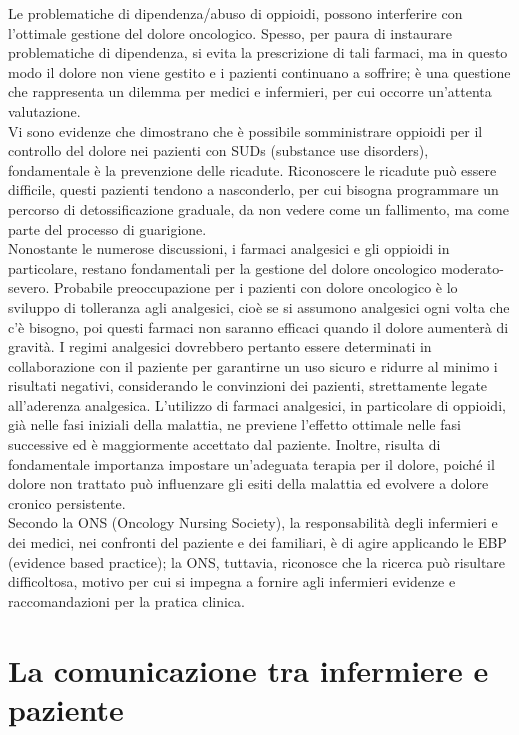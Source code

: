 Le problematiche di dipendenza/abuso di oppioidi, possono interferire con l’ottimale gestione del dolore oncologico. 
Spesso, per paura di instaurare problematiche di dipendenza, si evita la prescrizione di tali farmaci, 
ma in questo modo il dolore non viene gestito e i pazienti continuano a soffrire; 
è una questione che rappresenta un dilemma per medici e infermieri, per cui occorre un’attenta valutazione\cite{PAINONS}.\\ 
Vi sono evidenze che dimostrano che è possibile somministrare oppioidi per il controllo del dolore nei pazienti con SUDs 
(substance use disorders), fondamentale è la prevenzione delle ricadute. Riconoscere le ricadute può essere difficile, 
questi pazienti tendono a nasconderlo, per cui bisogna programmare un percorso di detossificazione graduale, 
da non vedere come un fallimento, ma come parte del processo di guarigione\cite{CANCERPAINONS}.\\
Nonostante le numerose discussioni, i farmaci analgesici e gli oppioidi in particolare, restano fondamentali per 
la gestione del dolore oncologico moderato-severo. Probabile preoccupazione per i pazienti con dolore oncologico 
è lo sviluppo di tolleranza agli analgesici, cioè se si assumono analgesici ogni volta che c’è bisogno, poi questi 
farmaci non saranno efficaci quando il dolore aumenterà di gravità. I regimi analgesici dovrebbero pertanto essere 
determinati in collaborazione con il paziente per garantirne un uso sicuro e ridurre al minimo i risultati negativi, 
considerando le convinzioni dei pazienti, strettamente legate all’aderenza analgesica\cite{analgesici}. L’utilizzo di 
farmaci analgesici, in particolare di oppioidi, già nelle fasi iniziali della malattia, ne previene l’effetto ottimale 
nelle fasi successive ed è maggiormente accettato dal paziente. Inoltre, risulta di fondamentale importanza impostare 
un’adeguata terapia per il dolore, poiché il dolore non trattato può influenzare gli esiti della malattia ed evolvere 
a dolore cronico persistente.\\ 

Secondo la ONS (Oncology Nursing Society), la responsabilità degli infermieri e dei medici, nei confronti 
del paziente e dei familiari, è di agire applicando le EBP (evidence based practice); 
la ONS, tuttavia, riconosce che la ricerca può risultare difficoltosa, 
motivo per cui si impegna a fornire agli infermieri evidenze e raccomandazioni per la pratica clinica\cite{PAINONS}.\\

\section{La comunicazione tra infermiere e paziente}

